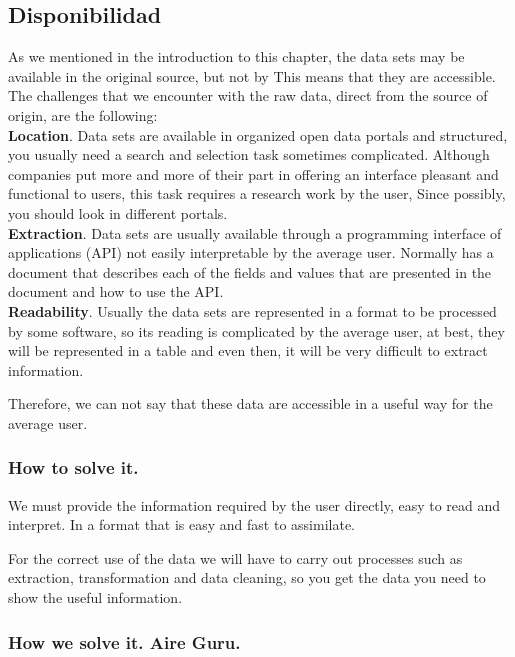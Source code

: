 \subsection{Disponibilidad}
    
As we mentioned in the introduction to this chapter, the data sets may be available in the original source, but not by
This means that they are accessible.
The challenges that we encounter with the raw data, direct from the source of origin, are the following: \\   
 
\textbf{Location}. Data sets are available in organized open data portals
and structured, you usually need a search and selection task
sometimes complicated. Although companies put more and more of their part in offering an interface
pleasant and functional to users, this task requires a research work by the user,
Since possibly, you should look in different portals. \\

\textbf{Extraction}. Data sets are usually available through a programming interface
of applications (API) not easily interpretable by the average user. Normally has
a document that describes each of the fields and values that are presented in the document and how to use the API. \\

\textbf{Readability}. Usually the data sets are represented in a format to be processed by
some software, so its reading is complicated by the average user, at best,
they will be represented in a table and even then, it will be very difficult to extract information.

Therefore, we can not say that these data are accessible in a useful way for the average user. \\

\subsubsection{How to solve it.} 

We must provide the information required by the user directly, easy to read and interpret. In a format
that is easy and fast to assimilate.

For the correct use of the data we will have to carry out processes such as extraction, transformation and
data cleaning, so you get the data you need to show the useful information.
 
\subsubsection{How we solve it. Aire Guru.} 

